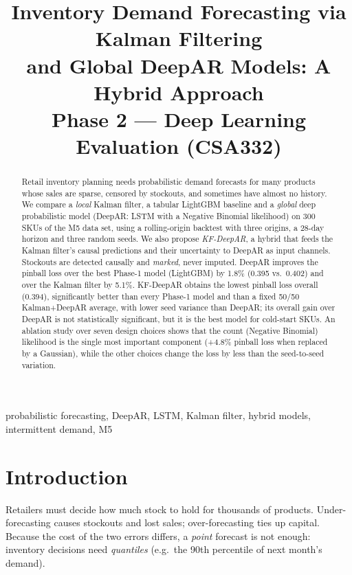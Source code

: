 \documentclass[conference]{IEEEtran}
\begin{document}
\title{Inventory Demand Forecasting via Kalman Filtering\\and Global DeepAR Models: A Hybrid Approach\\
\large Phase 2 --- Deep Learning Evaluation (CSA332)}

\author{
}

\maketitle

\begin{abstract}
Retail inventory planning needs probabilistic demand forecasts for many products whose sales are sparse, censored by stockouts,
and sometimes have almost no history. We compare a \emph{local} Kalman filter, a tabular LightGBM baseline and a \emph{global}
deep probabilistic model (DeepAR: LSTM with a Negative Binomial likelihood) on 300 SKUs of the M5 data set, using a rolling-origin
backtest with three origins, a 28-day horizon and three random seeds. We also propose \emph{KF-DeepAR}, a hybrid that feeds the
Kalman filter's causal predictions and their uncertainty to DeepAR as input channels. Stockouts are detected causally and \emph{marked},
never imputed. DeepAR improves the pinball loss over the best Phase-1 model (LightGBM) by 1.8\% (0.395 vs.\ 0.402) and over the Kalman
filter by 5.1\%. KF-DeepAR obtains the lowest pinball loss overall (0.394), significantly better than every Phase-1 model and than a fixed
50/50 Kalman+DeepAR average, with lower seed variance than DeepAR; its overall gain over DeepAR is not statistically significant,
but it is the best model for cold-start SKUs. An ablation study over seven design choices shows that the count (Negative Binomial) likelihood is the single most important component (+4.8\% pinball loss when replaced by a Gaussian),
while the other choices change the loss by less than the seed-to-seed variation.
\end{abstract}

\begin{IEEEkeywords}
probabilistic forecasting, DeepAR, LSTM, Kalman filter, hybrid models, intermittent demand, M5
\end{IEEEkeywords}

\section{Introduction}
Retailers must decide how much stock to hold for thousands of products. Under-forecasting causes stockouts and lost
sales; over-forecasting ties up capital. Because the cost of the two errors differs, a \emph{point} forecast is not
enough: inventory decisions need \emph{quantiles} (e.g.\ the 90th percentile of next month's demand).
\end{document}
